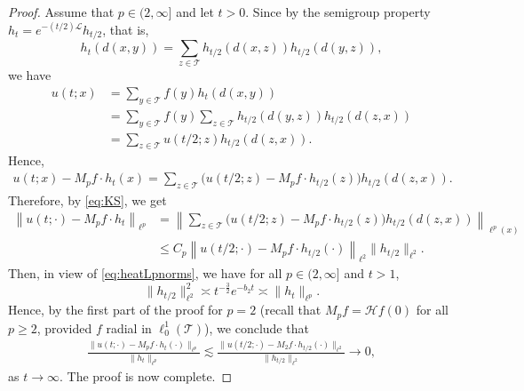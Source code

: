 \documentclass[11pt,a4paper,reqno]{amsart}
\renewcommand\mathcal{\mathscr}
\theoremstyle{plain}
\theoremstyle{remark}
\theoremstyle{definition}
\theoremstyle{remark}
\numberwithin{equation}{section}
\begin{document}
\begin{proof}
Assume that $p \in (2, \infty]$ and let $t>0$. Since by the semigroup property $h_t=e^{-(t/2)\mathcal{L}}h_{t/2}$, that is,
\[
h_t(d(x,y)) =\sum_{z \in \mathcal{T}} h_{t/2}(d(x,z)) h_{t/2}(d(y,z)),
\]
we have
\begin{align*}
	u(t; x) 
	&= \sum_{y \in \mathcal{T}} f(y) h_t(d(x,y)) \\
	&= \sum_{y \in \mathcal{T}} f(y) \sum_{z \in \mathcal{T}} h_{t/2}(d(y, z)) h_{t/2}(d(z,x)) \\
	&= \sum_{z \in \mathcal{T}} u(t/2; z) h_{t/2}(d(z,x)).
\end{align*}
Hence,
\begin{align*}
	u(t; x) - M_pf  \cdot h_t(x) = \sum_{z \in \mathcal{T}} \big( u(t/2; z) - M_pf \cdot h_{t/2}(z)\big) h_{t/2}(d(z,x)).
\end{align*}
Therefore, by \eqref{eq:KS},  we get 
\begin{align*}
	\left\| u(t; \cdot) - M_pf  \cdot h_t \right\|_{\ell^p}
	&=
	\left\|  \sum_{z \in \mathcal{T}} \big( u(t/2; z) - M_pf \cdot h_{t/2}(z)\big) h_{t/2}(d(z, x)) \right\|_{\ell^p(x)} \\
	&\leq
	C_p
	\left\|  u(t/2; \cdot) - M_pf \cdot h_{t/2}(\cdot) \right\|_{\ell^2}
	\|h_{t/2}\|_{\ell^2}.
\end{align*}
 Then, in view of \eqref{eq:heatLpnorms}, we have for all $p \in (2, \infty]$ and $t>1$,
\begin{equation*}
	\|h_{t/2}\|_{\ell^2}^2 \asymp t^{-\frac{3}{2}} e^{-b_2t}
	\asymp \|h_t\|_{\ell^p}.
\end{equation*}
Hence, by the first part of the proof for $p = 2$ (recall that $M_pf=\mathcal{H}f(0)$ for all $p\geq 2$, provided $f$ radial in $\ell^1_0(\mathcal{T})$), we conclude that
\begin{align*}
\frac{\|u(t; \cdot) - M_pf \cdot h_t(\cdot)\|_{\ell^p}}{\|h_t\|_{\ell^p}}
\lesssim\frac{\|u(t/2; \cdot) - M_2f \cdot h_{t/2}(\cdot)\|_{\ell^2}}{\|h_{t/2}\|_{\ell^2}}\to 0, 
\end{align*}
as $t\to \infty.$ The proof is now complete.
\end{proof}
\end{document}
